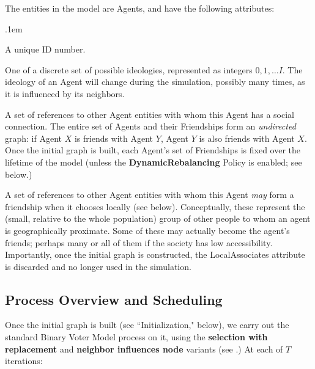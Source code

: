 The entities in the model are Agents, and have the following attributes:

\begin{description}
\itemsep.1em
\item[ID] A unique ID number.

\item[Ideology] One of a discrete set of possible ideologies, represented as
integers $0, 1, \dots I$. The ideology of an Agent will change during the
simulation, possibly many times, as it is influenced by its neighbors.

\item[Friendships] A set of references to other Agent entities with whom this
Agent has a social connection. The entire set of Agents and their Friendships
form an \textit{undirected} graph: if Agent $X$ is friends with Agent $Y$,
Agent $Y$ is also friends with Agent $X$.  Once the initial graph is built,
each Agent's set of Friendships is fixed over the lifetime of the model
(unless the \textbf{DynamicRebalancing} Policy is enabled; see below.)

\item[LocalAssociates] A set of references to other Agent entities with whom
this Agent \textit{may} form a friendship when it chooses locally (see below).
Conceptually, these represent the (small, relative to the whole population)
group of other people to whom an agent is geographically proximate. Some of
these may actually become the agent's friends; perhaps many or all of them if
the society has low accessibility. Importantly, once the initial graph is
constructed, the LocalAssociates attribute is discarded and no longer used in
the simulation.

\end{description}



\subsection{Process Overview and Scheduling}
\label{sec:BVM}

Once the initial graph is built (see ``Initialization," below), we carry out
the standard Binary Voter Model process on it, using the \textbf{selection
with replacement} and \textbf{neighbor influences node} variants (see
\cite{davies_computational_2016}.) At each of $T$ iterations:

